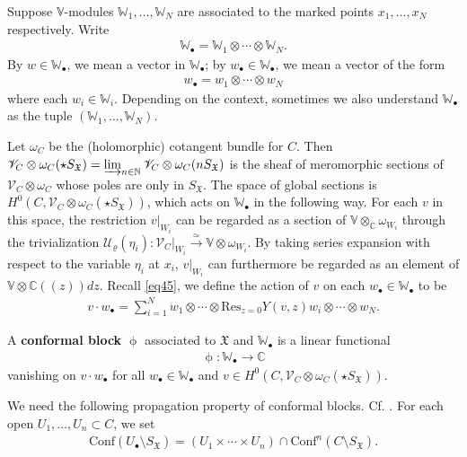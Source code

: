 \documentclass[11pt,b5paper,notitlepage]{article}
\theoremstyle{definition}
\theoremstyle{plain}
\newcommand{\fk}{\mathfrak}
\newcommand{\mc}{\mathcal}
\newcommand{\Conf}{\mathrm{Conf}}
\newcommand{\Res}{\mathrm{Res}}
\newcommand{\scr}{\mathscr}
\newcommand{\SX}{{S_{\fk X}}}
\newcommand{\blt}{\bullet}
\newcommand{\Vbb}{\mathbb V}
\newcommand{\Wbb}{\mathbb W}
\newcommand{\Cbb}{\mathbb C}
\newcommand{\Nbb}{\mathbb N}
\numberwithin{equation}{subsection}
\begin{document}
Suppose $\Vbb$-modules $\Wbb_1,\dots,\Wbb_N$ are associated to the marked points $x_1,\dots,x_N$ respectively. Write
\begin{align*}
\Wbb_\blt=\Wbb_1\otimes\cdots\otimes \Wbb_N.	
\end{align*}
By $w\in\Wbb_\blt$, we mean a vector in $\Wbb_\blt$; by $w_\blt\in\Wbb_\blt$, we mean a vector of the form
\begin{align*}
w_\blt=w_1\otimes\cdots\otimes w_N	
\end{align*}
where each $w_i\in \Wbb_i$. Depending on the context, sometimes we also understand $\Wbb_\blt$ as the tuple $(\Wbb_1,\dots,\Wbb_N)$. 


Let $\omega_C$ be the (holomorphic) cotangent bundle for $C$. Then $\scr V_C\otimes\omega_C(\star\SX)=\varinjlim_{n\in\Nbb}\scr V_C\otimes\omega_C(n\SX)$ is the sheaf of meromorphic sections of $\scr V_C\otimes\omega_C$ whose poles are only in $\SX$. The space of global sections is $H^0(C,\scr V_C\otimes\omega_C(\star\SX))$, which acts on $\Wbb_\blt$ in the following way. For each $v$ in this space, the restriction $v|_{W_i}$ can be regarded as a section of $\Vbb\otimes_\Cbb\omega_{W_i}$ through the trivialization $\mc U_\varrho(\eta_i):\scr V_C|_{W_i}\xrightarrow{\simeq}\Vbb\otimes\omega_{W_i}$. By taking series expansion with respect to the variable $\eta_i$ at $x_i$, $v|_{W_i}$ can furthermore be regarded as an element of $\Vbb\otimes\Cbb((z))dz$. Recall \eqref{eq45}, we define the action of $v$ on each $w_\blt\in\Wbb_\blt$ to be
\begin{align*}
v\cdot w_\blt=\sum_{i=1}^N w_1\otimes\cdots\otimes \Res_{z=0}Y(v,z)w_i \otimes\cdots\otimes w_N.	
\end{align*} 



A \textbf{conformal block} $\upphi$ associated to $\fk X$ and $\Wbb_\blt$ is a linear functional
\begin{align*}
\upphi:\Wbb_\blt\rightarrow\Cbb	
\end{align*}
vanishing on $v\cdot w_\blt$ for all $w_\blt\in\Wbb_\blt$ and $v\in H^0(C,\scr V_C\otimes\omega_C(\star\SX))$.


We need the following propagation property of conformal blocks. Cf. \cite[Sec. 8]{Gui24b}. For each open $U_1,\dots,U_n\subset C$, we set \index{Conf@$\Conf(U_\blt\setminus\SX)$}
\begin{gather*}
\Conf(U_\blt\setminus\SX)=(U_1\times\cdots\times U_n)\cap\Conf^n(C\setminus\SX).	
\end{gather*}
\end{document}
